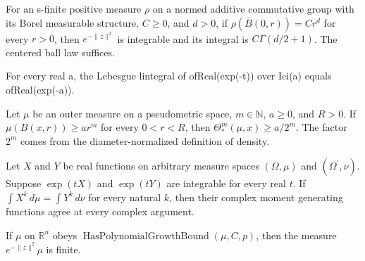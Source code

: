 \begin{lemma}
\label{lem:gaussian-ball-power}

For an s-finite positive measure $\rho$ on a normed additive commutative group with its Borel measurable structure, $C\geq0$, and $d>0$, if $\rho(\overline B(0,r))=Cr^d$ for every $r>0$, then $e^{-\|z\|^2}$ is integrable and its integral is $C\Gamma(d/2+1)$. The centered ball law suffices.
\end{lemma}

\begin{lemma}
\label{lem:exponential-tail-integral}

For every real a, the Lebesgue lintegral of ofReal(exp(-t)) over Ici(a) equals ofReal(exp(-a)).
\end{lemma}

\begin{lemma}
\label{lem:lower-density-from-power}

Let $\mu$ be an outer measure on a pseudometric space, $m\in\mathbb N$, $a\geq0$, and $R>0$. If $\mu(B(x,r))\geq a r^m$ for every $0<r<R$, then $\Theta_*^m(\mu,x)\geq a/2^m$. The factor $2^m$ comes from the diameter-normalized definition of density.
\end{lemma}

\begin{lemma}
\label{lem:complex-mgf-moment-determination}

Let $X$ and $Y$ be real functions on arbitrary measure spaces $(\Omega,\mu)$ and $(\Omega^\prime,\nu)$. Suppose $\exp(tX)$ and $\exp(tY)$ are integrable for every real $t$. If $\int X^k\,d\mu=\int Y^k\,d\nu$ for every natural $k$, then their complex moment generating functions agree at every complex argument.
\end{lemma}

\begin{lemma}
\label{lem:gaussian-weight-finite}

If $\mu$ on $\mathbb R^n$ obeys $\operatorname{HasPolynomialGrowthBound}(\mu,C,p)$, then the measure $e^{-\|z\|^2}\mu$ is finite.
\end{lemma}

